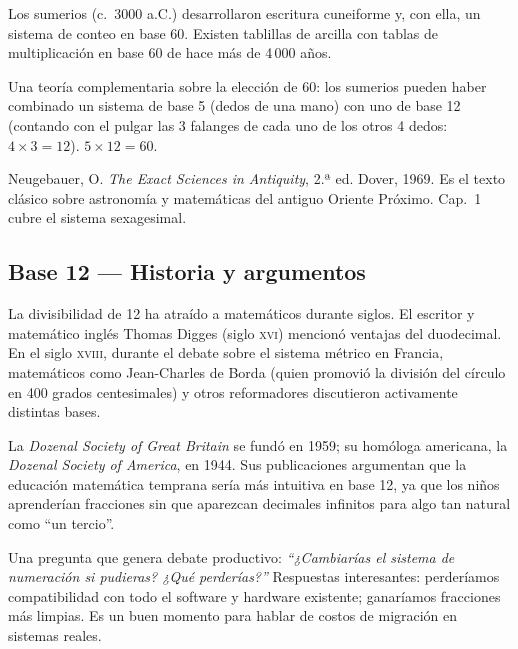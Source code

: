 \documentclass[12pt, oneside]{article}
\begin{document}
Los sumerios (c.\ 3000 a.C.) desarrollaron escritura cuneiforme y, con ella,
un sistema de conteo en base 60. Existen tablillas de arcilla con tablas de
multiplicación en base 60 de hace más de 4\,000 años.

Una teoría complementaria sobre la elección de 60: los sumerios pueden haber
combinado un sistema de base 5 (dedos de una mano) con uno de base 12
(contando con el pulgar las 3 falanges de cada uno de los otros 4 dedos:
$4 \times 3 = 12$). $5 \times 12 = 60$.

\begin{notaprofesor}[Referencia]
  Neugebauer, O. \textit{The Exact Sciences in Antiquity}, 2.ª ed.
  Dover, 1969. Es el texto clásico sobre astronomía y matemáticas del
  antiguo Oriente Próximo. Cap.\ 1 cubre el sistema sexagesimal.
\end{notaprofesor}

\subsection{Base 12 — Historia y argumentos}

La divisibilidad de 12 ha atraído a matemáticos durante siglos.
El escritor y matemático inglés Thomas Digges (siglo \textsc{xvi}) mencionó
ventajas del duodecimal. En el siglo \textsc{xviii}, durante el debate sobre
el sistema métrico en Francia, matemáticos como Jean-Charles de Borda
(quien promovió la división del círculo en 400 grados centesimales) y otros
reformadores discutieron activamente distintas bases.

La \textit{Dozenal Society of Great Britain} se fundó en 1959; su homóloga
americana, la \textit{Dozenal Society of America}, en 1944.
Sus publicaciones argumentan que la educación matemática temprana sería más
intuitiva en base 12, ya que los niños aprenderían fracciones sin que
aparezcan decimales infinitos para algo tan natural como ``un tercio''.

\begin{notaprofesor}
  Una pregunta que genera debate productivo: \textit{``¿Cambiarías el sistema
  de numeración si pudieras? ¿Qué perderías?''}
  Respuestas interesantes: perderíamos compatibilidad con todo el software
  y hardware existente; ganaríamos fracciones más limpias. Es un buen
  momento para hablar de costos de migración en sistemas reales.
\end{notaprofesor}

\end{document}
